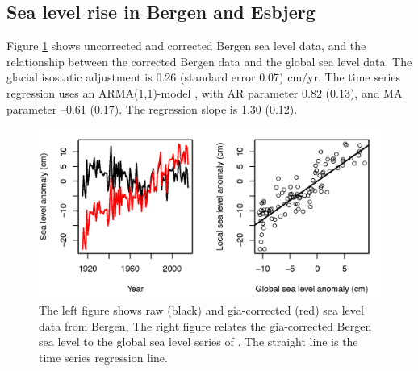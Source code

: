 \documentclass[draft,linenumbers]{agujournal}
\begin{document}
\subsection{Sea level rise in Bergen and Esbjerg}

Figure \ref{fig:bergenobs} shows uncorrected and corrected Bergen sea level data, and the relationship between the corrected Bergen data and the global sea level data. The glacial isostatic adjustment is 0.26 (standard error 0.07) cm/yr. The time series regression uses an ARMA(1,1)-model \citep{boxjenkins}, with AR parameter 0.82 (0.13), and MA parameter --0.61 (0.17). The regression slope is 1.30 (0.12).

\begin{figure}[!hbpt]
\begin{center}
\includegraphics[width=0.75\linewidth]{bergenfit_edit.png}
\caption{ The left figure shows raw (black) and gia-corrected (red) sea level data from Bergen, The right figure relates the gia-corrected Bergen sea level to the global sea level series of \citet{csiro}. The straight line is the time series regression line.}
\label{fig:bergenobs}
\end{center}
\end{figure}
\end{document}
